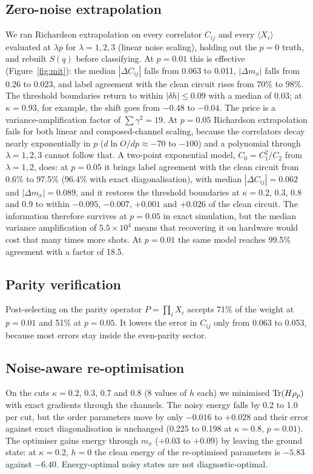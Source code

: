 \documentclass[10pt,twocolumn]{article}
\begin{document}
\subsection{Zero-noise extrapolation}
We ran Richardson extrapolation on every correlator $C_{ij}$ and every $\langle X_i\rangle$ evaluated at $\lambda p$ for $\lambda=1,2,3$ (linear noise scaling), holding out the $p=0$ truth, and rebuilt $S(q)$ before classifying. At $p=0.01$ this is effective (Figure~\ref{fig:mit}): the median $|\Delta C_{ij}|$ falls from 0.063 to 0.011, $|\Delta m_x|$ falls from 0.26 to 0.023, and label agreement with the clean circuit rises from 70\% to 98\%. The threshold boundaries return to within $|\delta h|\le0.09$ with a median of 0.03; at $\kappa=0.93$, for example, the shift goes from $-0.48$ to $-0.04$. The price is a variance-amplification factor of $\sum\gamma^2=19$. At $p=0.05$ Richardson extrapolation fails for both linear and composed-channel scaling, because the correlators decay nearly exponentially in $p$ ($d\ln O/dp\approx-70$ to $-100$) and a polynomial through $\lambda=1,2,3$ cannot follow that. A two-point exponential model, $C_0=C_1^2/C_2$ from $\lambda=1,2$, does: at $p=0.05$ it brings label agreement with the clean circuit from 0.6\% to 97.5\% (96.4\% with exact diagonalisation), with median $|\Delta C_{ij}|=0.062$ and $|\Delta m_x|=0.089$, and it restores the threshold boundaries at $\kappa=0.2$, $0.3$, $0.8$ and $0.9$ to within $-0.095$, $-0.007$, $+0.001$ and $+0.026$ of the clean circuit. The information therefore survives at $p=0.05$ in exact simulation, but the median variance amplification of $5.5\times10^4$ means that recovering it on hardware would cost that many times more shots. At $p=0.01$ the same model reaches 99.5\% agreement with a factor of 18.5.

\subsection{Parity verification}
Post-selecting on the parity operator $P=\prod_i X_i$ accepts 71\% of the weight at $p=0.01$ and 51\% at $p=0.05$. It lowers the error in $C_{ij}$ only from 0.063 to 0.053, because most errors stay inside the even-parity sector.

\subsection{Noise-aware re-optimisation}
On the cuts $\kappa=0.2$, $0.3$, $0.7$ and $0.8$ (8 values of $h$ each) we minimised ${\rm Tr}(H\rho_p)$ with exact gradients through the channels. The noisy energy falls by 0.2 to 1.0 per cut, but the order parameters move by only $-0.016$ to $+0.028$ and their error against exact diagonalisation is unchanged (0.225 to 0.198 at $\kappa=0.8$, $p=0.01$). The optimiser gains energy through $m_x$ ($+0.03$ to $+0.09$) by leaving the ground state: at $\kappa=0.2$, $h=0$ the clean energy of the re-optimised parameters is $-5.83$ against $-6.40$. Energy-optimal noisy states are not diagnostic-optimal.
\end{document}
